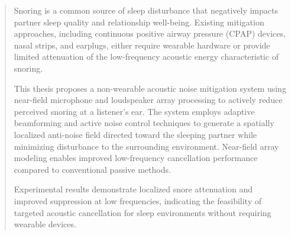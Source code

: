 %
%
%

\begin{abstract}

Snoring is a common source of sleep disturbance that negatively impacts partner sleep quality and relationship well-being. Existing mitigation approaches, including continuous positive airway pressure (CPAP) devices, nasal strips, and earplugs, either require wearable hardware or provide limited attenuation of the low-frequency acoustic energy characteristic of snoring.

This thesis proposes a non-wearable acoustic noise mitigation system using near-field microphone and loudspeaker array processing to actively reduce perceived snoring at a listener’s ear. The system employs adaptive beamforming and active noise control techniques to generate a spatially localized anti-noise field directed toward the sleeping partner while minimizing disturbance to the surrounding environment. Near-field array modeling enables improved low-frequency cancellation performance compared to conventional passive methods.

Experimental results demonstrate localized snore attenuation and improved suppression at low frequencies, indicating the feasibility of targeted acoustic cancellation for sleep environments without requiring wearable devices.

\end{abstract}


